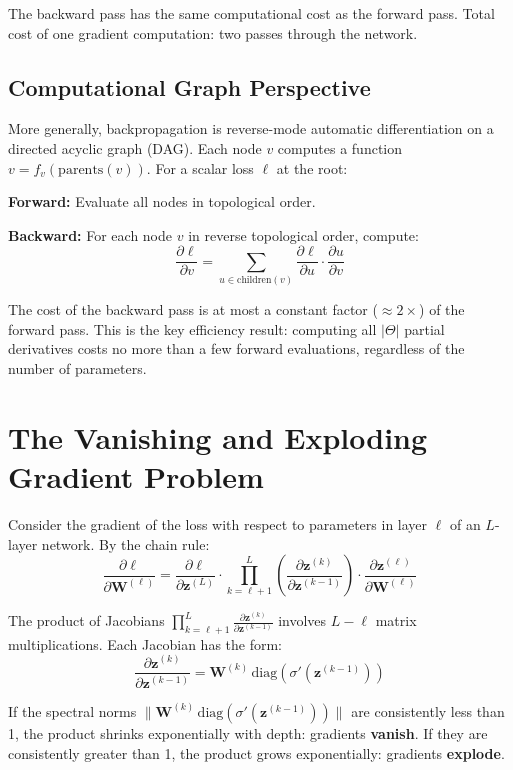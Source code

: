 \documentclass[main.tex]{subfiles}
\begin{document}
The backward pass has the same computational cost as the forward pass. Total cost of one gradient computation: two passes through the network.

\subsection{Computational Graph Perspective}

More generally, backpropagation is reverse-mode automatic differentiation on a directed acyclic graph (DAG). Each node $v$ computes a function $v = f_v(\text{parents}(v))$. For a scalar loss $\ell$ at the root:

\textbf{Forward:} Evaluate all nodes in topological order.

\textbf{Backward:} For each node $v$ in reverse topological order, compute:
$$\frac{\partial \ell}{\partial v} = \sum_{u \in \text{children}(v)} \frac{\partial \ell}{\partial u} \cdot \frac{\partial u}{\partial v}$$

The cost of the backward pass is at most a constant factor ($\approx 2\times$) of the forward pass. This is the key efficiency result: computing all $|\Theta|$ partial derivatives costs no more than a few forward evaluations, regardless of the number of parameters.

\needspace{0.33\textheight}
\section{The Vanishing and Exploding Gradient Problem}

Consider the gradient of the loss with respect to parameters in layer $\ell$ of an $L$-layer network. By the chain rule:
$$\frac{\partial \ell}{\partial \mathbf{W}^{(\ell)}} = \frac{\partial \ell}{\partial \mathbf{z}^{(L)}} \cdot \prod_{k=\ell+1}^{L} \left(\frac{\partial \mathbf{z}^{(k)}}{\partial \mathbf{z}^{(k-1)}}\right) \cdot \frac{\partial \mathbf{z}^{(\ell)}}{\partial \mathbf{W}^{(\ell)}}$$

The product of Jacobians $\prod_{k=\ell+1}^{L} \frac{\partial \mathbf{z}^{(k)}}{\partial \mathbf{z}^{(k-1)}}$ involves $L - \ell$ matrix multiplications. Each Jacobian has the form:
$$\frac{\partial \mathbf{z}^{(k)}}{\partial \mathbf{z}^{(k-1)}} = \mathbf{W}^{(k)}\,\text{diag}\!\left(\sigma'(\mathbf{z}^{(k-1)})\right)$$

If the spectral norms $\|\mathbf{W}^{(k)}\,\text{diag}(\sigma'(\mathbf{z}^{(k-1)}))\|$ are consistently less than 1, the product shrinks exponentially with depth: gradients \textbf{vanish}. If they are consistently greater than 1, the product grows exponentially: gradients \textbf{explode}.
\end{document}
